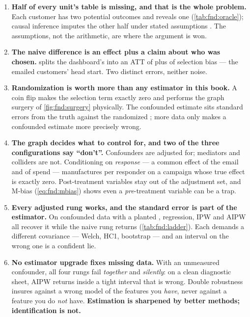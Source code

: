 \begin{enumerate}[leftmargin=*, itemsep=.45em]
  \item \textbf{Half of every unit's table is missing, and that is the whole problem.} Each
        customer has two potential outcomes and reveals one (\cref{tab:fnd:oracle}); causal
        inference imputes the other half under stated assumptions \citep{holland1986, ding2018}.
        The assumptions, not the arithmetic, are where the argument is won.

  \item \textbf{The naive difference is an effect plus a claim about who was chosen.}
         splits the dashboard's \eur{\nbZeroNaiveObs} into an ATT of
        \eur{\nbZeroAtt} plus \eur{\nbZeroSelBias} of selection bias --- the emailed customers'
        head start. Two distinct errors, neither noise.

  \item \textbf{Randomization is worth more than any estimator in this book.} A coin flip makes
        the selection term exactly zero and performs the graph surgery of \cref{fig:fnd:surgery}
        physically. The confounded estimate sits \nbZeroObsSeDist{} standard errors from the truth
        against the randomized \nbZeroRandSeDist{}; more data only makes a confounded estimate more
        precisely wrong.

  \item \textbf{The graph decides what to control for, and two of the three configurations say
        ``don't''.} Confounders are adjusted for; mediators and colliders are not. Conditioning on
        \emph{response} --- a common effect of the email and of spend --- manufactures
        \eur{\nbZeroColliderResp} per responder on a campaign whose true effect is exactly zero.
        Post-treatment variables stay out of the adjustment set, and M-bias (\cref{eq:fnd:mbias})
        shows even a \emph{pre}-treatment variable can be a trap.

  \item \textbf{Every adjusted rung works, and the standard error is part of the estimator.} On
        confounded data with a planted \eur{\nbZeroTrueDag}, regression, IPW and AIPW all recover
        it while the naive rung returns \eur{\nbZeroLadNaive} (\cref{tab:fnd:ladder}). Each demands
        a different covariance --- Welch, HC1, bootstrap --- and an interval on the wrong one is a
        confident lie.

  \item \textbf{No estimator upgrade fixes missing data.} With an unmeasured confounder, all four
        rungs fail \emph{together} and \emph{silently}: on a clean diagnostic sheet, AIPW returns
        \eur{\nbZeroHidPanelEst} inside a tight interval that is \eur{\nbZeroHidPanelBias} wrong.
        Double robustness insures against a wrong model of the features you \emph{have}, never
        against a feature you do \emph{not} have. \textbf{Estimation is sharpened by better methods;
        identification is not.}


\end{enumerate}
